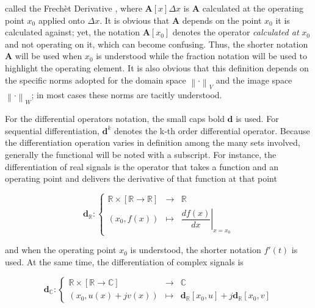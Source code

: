 	\noindent called the Frechèt Derivative , where $\mathbf{A}\left[x\right] \Delta x$ is $\mathbf{A}$ calculated at the operating point $x_0$ applied onto $\Delta x$. It is obvious that $\mathbf{A}$ depends on the point $x_0$ it is calculated against; yet, the notation $\mathbf{A}\left[x_0\right]$ denotes the operator \textit{calculated at} $x_0$ and not operating on it, which can become confusing. Thus, the shorter notation $\mathbf{A}$ will be used when $x_0$ is understood while the fraction notation will be used to highlight the operating element. It is also obvious that this definition depends on the specific norms adopted for the domain space $\left\lVert\cdot\right\rVert_V$ and the image space $\left\lVert\cdot\right\rVert_W$; in most cases these norms are tacitly understood.

	For the differential operators notation, the small caps bold $\mathbf{d}$ is used. For sequential differentiation, $\mathbf{d}^k$ denotes the k-th order differential operator. Because the differentiation operation varies in definition among the many sets involved, generally the functional will be noted with a subscript. For instance, the differentiation of real signals is the operator that takes a function and an operating point and delivers the derivative of that function at that point

\begin{equation}\mathbf{d}_\mathbb{R}: \left\{\begin{array}{rcl} \mathbb{R}\times\left[\mathbb{R}\to\mathbb{R}\right] &\to& \mathbb{R} \\[3mm] \left(x_0,f(x)\right) &\mapsto& \left.\dfrac{df(x)}{dx}\right\rvert_{x=x_0} \end{array}\right.\end{equation}

	\noindent and when the operating point $x_0$ is understood, the shorter notation $f'(t)$ is used. At the same time, the differentiation of complex signals is

\begin{equation}\mathbf{d}_\mathbb{C}: \left\{\begin{array}{ccc} \mathbb{R}\times\left[\mathbb{R} \to\mathbb{C}\right] &\to& \mathbb{C} \\[3mm] \left(x_0,u(x) + jv(x)\right) &\mapsto& \mathbf{d}_\mathbb{R}\left[x_0,u\right] + j \mathbf{d}_\mathbb{R}\left[x_0,v\right]\end{array}\right.\end{equation}

